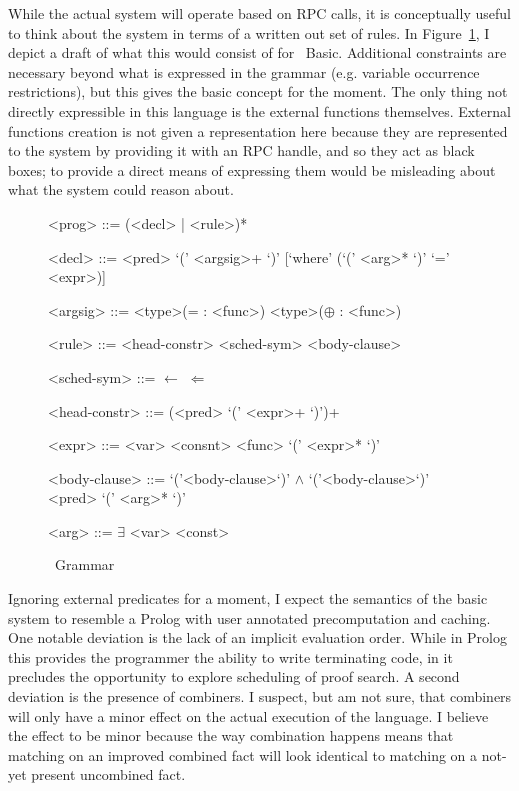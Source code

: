 While the actual system will operate based on RPC calls, it is conceptually useful to think about the system in terms of a written out set of rules.
In Figure~\ref{fig:holmesGrammar}, I depict a draft of what this would consist of for \sysname\ Basic.
Additional constraints are necessary beyond what is expressed in the grammar (e.g. variable occurrence restrictions), but this gives the basic concept for the moment.
The only thing not directly expressible in this language is the external functions themselves.
External functions creation is not given a representation here because they are represented to the system by providing it with an RPC handle, and so they act as black boxes;
to provide a direct means of expressing them would be misleading about what the system could reason about.

\begin{figure}
\begin{grammar}

<prog> ::= (<decl> | <rule>)*

<decl> ::= <pred> `(' <argsig>+ `)' [`where' (`(' <arg>* `)' `=' <expr>)]

<argsig>
::=  <type>(= : <func>)
\alt <type>($\oplus$ : <func>)

<rule> ::= <head-constr> <sched-sym> <body-clause>

<sched-sym> ::= $\leftarrow$
\alt $\Leftarrow$

<head-constr> ::= (<pred> `(' <expr>+ `)')+

<expr> ::= <var>
\alt <consnt>
\alt <func> `(' <expr>* `)'

<body-clause>
::=  `('<body-clause>`)' $\wedge$ `('<body-clause>`)'
\alt <pred> `(' <arg>* `)'

<arg> ::= $\exists$ \alt <var> \alt <const>
\end{grammar}
\label{fig:holmesGrammar}
\caption{\sysname\ Grammar}
\end{figure}

Ignoring external predicates for a moment, I expect the semantics of the basic system to resemble a Prolog with user annotated precomputation and caching.
One notable deviation is the lack of an implicit evaluation order.
While in Prolog this provides the programmer the ability to write terminating code, in \sysname it precludes the opportunity to explore scheduling of proof search.
A second deviation is the presence of combiners.
I suspect, but am not sure, that combiners will only have a minor effect on the actual execution of the language.
I believe the effect to be minor because the way combination happens means that matching on an improved combined fact will look identical to matching on a not-yet present uncombined fact.

